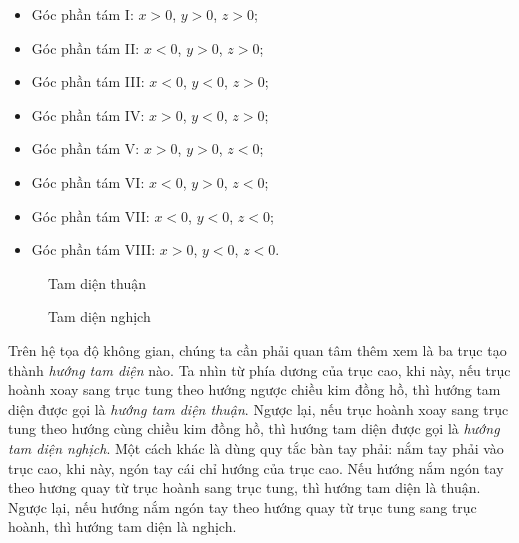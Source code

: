 \begin{itemize}
   \item Góc phần tám I: $x>0$, $y>0$, $z>0$;
   \item Góc phần tám II: $x<0$, $y>0$, $z>0$;
   \item Góc phần tám III: $x<0$, $y<0$, $z>0$;
   \item Góc phần tám IV: $x>0$, $y<0$, $z>0$;
   \item Góc phần tám V: $x>0$, $y>0$, $z<0$;
   \item Góc phần tám VI: $x<0$, $y>0$, $z<0$;
   \item Góc phần tám VII: $x<0$, $y<0$, $z<0$;
   \item Góc phần tám VIII: $x>0$, $y<0$, $z<0$.
\end{itemize}

\begin{figure}[h]
   \centering
   \begin{minipage}[b]{0.48\textwidth}
      \centering
      \caption{Tam diện thuận}
      \label{fig:tam dien thuan}
   \end{minipage}
   \hfill
   \begin{minipage}[b]{0.48\textwidth}
      \centering
      \caption{Tam diện nghịch}
      \label{fig:tam dien nghich}
   \end{minipage}
\end{figure}

Trên hệ tọa độ không gian, chúng ta cần phải quan tâm thêm xem là ba trục tạo thành \emph{hướng tam diện} nào. Ta nhìn từ phía dương của trục cao, khi này, nếu trục hoành xoay sang trục tung theo hướng ngược chiều kim đồng hồ, thì hướng tam diện được gọi là \emph{hướng tam diện thuận}. Ngược lại, nếu trục hoành xoay sang trục tung theo hướng cùng chiều kim đồng hồ, thì hướng tam diện được gọi là \emph{hướng tam diện nghịch}. Một cách khác là dùng quy tắc bàn tay phải: nắm tay phải vào trục cao, khi này, ngón tay cái chỉ hướng của trục cao. Nếu hướng nắm ngón tay theo hương quay từ trục hoành sang trục tung, thì hướng tam diện là thuận. Ngược lại, nếu hướng nắm ngón tay theo hướng quay từ trục tung sang trục hoành, thì hướng tam diện là nghịch.

